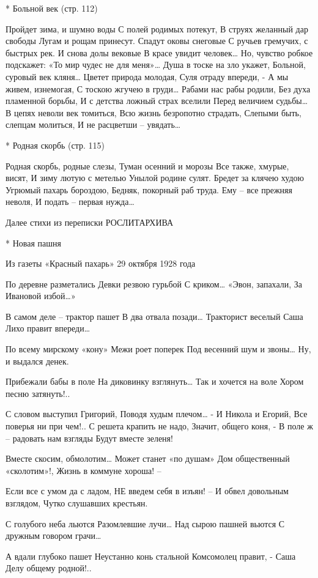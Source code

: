 * Больной век (стр. 112)

Пройдет зима, и шумно воды
С полей родимых потекут,
В струях желанный дар свободы
Лугам и рощам принесут.
Спадут оковы снеговые
С ручьев гремучих, с быстрых рек.
И снова долы вековые
В красе увидит человек…
Но, чувство робкое подскажет:
 «То мир чудес не для меня»…
Душа в тоске на зло укажет,
Больной, суровый век кляня…
Цветет природа молодая,
Суля отраду впереди, -
А мы живем, изнемогая,
С тоскою жгучею в груди…
Рабами нас рабы родили,
Без духа пламенной борьбы,
И с детства ложный страх вселили
Перед величием судьбы…
В цепях неволи век томиться,
Всю  жизнь безропотно страдать,
Слепыми быть, слепцам молиться,
И не расцветши – увядать…


* Родная скорбь (стр. 115)

Родная скорбь, родные слезы,
Туман осенний и морозы
Все также, хмурые, висят,
И зиму лютую с метелью
Унылой родине сулят.
Бредет за клячею худою
Угрюмый пахарь бороздою,
Бедняк, покорный раб труда.
Ему – все прежняя неволя,
И подать – первая нужда…




Далее стихи из переписки РОСЛИТАРХИВА


* Новая пашня

Из газеты «Красный пахарь» 29 октября 1928 года

По деревне разметались
Девки резвою гурьбой
С криком… «Эвон, запахали,
За Ивановой избой…»

В самом деле – трактор пашет
В два отвала позади…
Тракторист веселый Саша
Лихо правит впереди…

По всему мирскому «кону»
Межи роет поперек
Под весенний шум и звоны…
Ну, и выдался денек.

Прибежали бабы в поле
На диковинку взглянуть…
Так и хочется на воле
Хором песню затянуть!..

С словом выступил Григорий,
Поводя худым плечом…
- И Никола и Егорий,
Все поверья ни при чем!..
С решета крапить не надо,
Значит, общего коня, -
В поле ж – радовать нам взгляды
Будут вместе зеленя!

Вместе скосим, обмолотим…
Может станет «по душам»
Дом общественный «сколотим»!,
Жизнь в коммуне хороша! –

Если все с умом да с ладом,
НЕ введем себя в изъян! –
И обвел довольным взглядом,
Чутко слушавших крестьян.

С голубого неба льются
Разомлевшие лучи…
Над сырою пашней вьются
С дружным говором грачи…

А вдали глубоко пашет
Неустанно конь стальной
Комсомолец правит, - Саша
Делу общему родной!..


